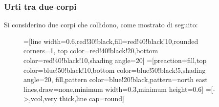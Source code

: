 \documentclass[a4paper]{extarticle}
\begin{document}
\subsubsection{Urti tra due corpi}
Si considerino due corpi che collidono, come mostrato di seguito:

\begin{figure}[H]
  =[line width=0.6,red!30!black,fill=red!40!black!10,rounded corners=1,
                    top color=red!40!black!20,bottom color=red!40!black!10,shading angle=20]
  =[preaction={fill,top color=blue!50!black!10,bottom color=blue!50!black!5,shading angle=20},
                      fill,pattern color=blue!20!black,pattern=north east lines,draw=none,minimum width=0.3,minimum height=0.6]
  =[->,vcol,very thick,line cap=round]


\end{figure}
\end{document}
